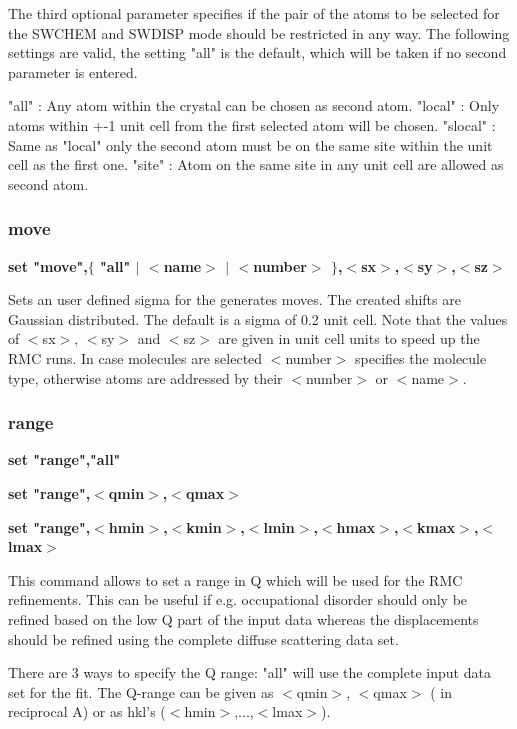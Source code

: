 The third optional parameter specifies if the pair of the atoms to 
be selected for the SWCHEM and SWDISP mode should be restricted in 
any way. The following settings are valid, the setting "all" is the 
default, which will be taken if no second parameter is entered. 
\par
\begin{MacVerbatim}
"all"      : Any atom within the crystal can be chosen as second atom.
"local"    : Only atoms within +-1 unit cell from the first selected
             atom will be chosen.
"slocal"   : Same as "local" only the second atom must be on the same
             site within the unit cell as the first one.
"site"     : Atom on the same site in any unit cell are allowed as
             second atom.

\end{MacVerbatim}
\subsubsection{move}
{\bf set "move",$ \{$ "all" $| $ $ <$name$> $ $| $ $ <$number$> $ $\} $,$ <$sx$> $,$ <$sy$> $,$ <$sz$> $ \par }
\par
\vspace{3pt}
Sets an user defined sigma for the generates moves. The created shifts 
are Gaussian distributed. The default is a sigma of 0.2 unit cell. Note 
that the values of $ <$sx$> $, $ <$sy$> $ and $ <$sz$> $ are given in unit cell units to 
speed up the RMC runs. In case molecules are selected $ <$number$> $ specifies 
the molecule type, otherwise atoms are addressed by their $ <$number$> $ or 
$ <$name$> $. 
\subsubsection{range}
{\bf set "range","all" \par }
{\bf set "range",$ <$qmin$> $,$ <$qmax$> $ \par }
{\bf set "range",$ <$hmin$> $,$ <$kmin$> $,$ <$lmin$> $,$ <$hmax$> $,$ <$kmax$> $,$ <$lmax$> $ \par }
\par
\vspace{3pt}
This command allows to set a range in Q which will be used for the 
RMC refinements. This can be useful if e.g. occupational disorder 
should only be refined based on the low Q part of the input data 
whereas the displacements should be refined using the complete 
diffuse scattering data set. 
\par
There are 3 ways to specify the Q range: "all" will use the complete 
input data set for the fit. The Q-range can be given as $ <$qmin$> $, $ <$qmax$> $ 
( in reciprocal A) or as hkl's ($ <$hmin$> $,...,$ <$lmax$> $). 
